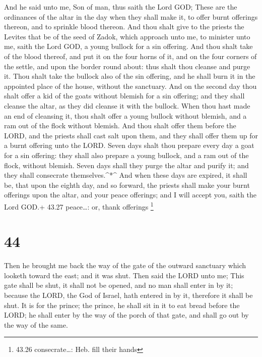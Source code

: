  And he said unto me, Son of man, thus saith the Lord GOD;
These are the ordinances of the altar in the day when they shall make
it, to offer burnt offerings thereon, and to sprinkle blood thereon.
 And thou shalt give to the priests the Levites that be of
the seed of Zadok, which approach unto me, to minister unto me, saith
the Lord GOD, a young bullock for a sin offering.  And thou
shalt take of the blood thereof, and put it on the four horns of it, and
on the four corners of the settle, and upon the border round about: thus
shalt thou cleanse and purge it.  Thou shalt take the
bullock also of the sin offering, and he shall burn it in the appointed
place of the house, without the sanctuary.  And on the
second day thou shalt offer a kid of the goats without blemish for a sin
offering; and they shall cleanse the altar, as they did cleanse it with
the bullock.  When thou hast made an end of cleansing it,
thou shalt offer a young bullock without blemish, and a ram out of the
flock without blemish.  And thou shalt offer them before
the LORD, and the priests shall cast salt upon them, and they shall
offer them up for a burnt offering unto the LORD.  Seven
days shalt thou prepare every day a goat for a sin offering: they shall
also prepare a young bullock, and a ram out of the flock, without
blemish.  Seven days shall they purge the altar and purify
it; and they shall consecrate themselves.\^{}*\^{}  And
when these days are expired, it shall be, that upon the eighth day, and
so forward, the priests shall make your burnt offerings upon the altar,
and your peace offerings; and I will accept you, saith the Lord GOD.+
43.27 peace\ldots: or, thank offerings \footnote{43.26 consecrate\ldots:
  Heb. fill their hands}

\hypertarget{section-43}{%
\section{44}\label{section-43}}

 Then he brought me back the way of the gate of the outward
sanctuary which looketh toward the east; and it was shut. 
Then said the LORD unto me; This gate shall be shut, it shall not be
opened, and no man shall enter in by it; because the LORD, the God of
Israel, hath entered in by it, therefore it shall be shut. 
It is for the prince; the prince, he shall sit in it to eat bread before
the LORD; he shall enter by the way of the porch of that gate, and shall
go out by the way of the same.

